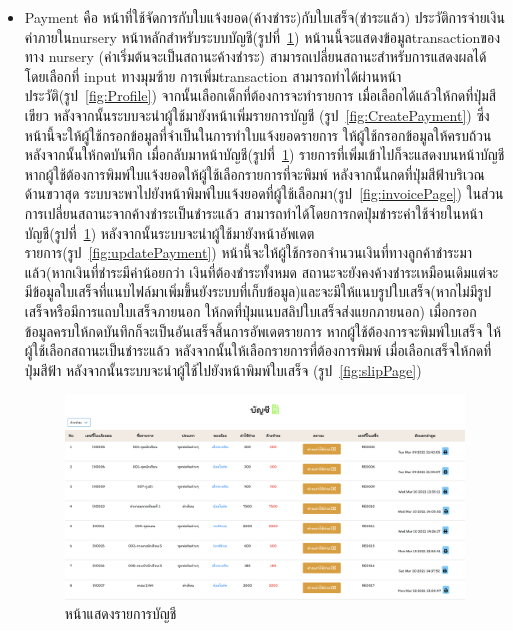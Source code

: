 \begin{itemize}
  \item  Payment คือ หน้าที่ใช้จัดการกับใบแจ้งยอด(ค้างชำระ)กับใบเสร็จ(ชำระแล้ว) ประวัติการจ่ายเงินค่าภายในnursery หน้าหลักสำหรับระบบบัญชี(รูปที่~\ref{fig:Payment}) หน้านนี้จะแสดงข้อมูลtransactionของทาง nursery (ค่าเริ่มต้นจะเป็นสถานะค้างชำระ) สามารถเปลี่ยนสถานะสำหรับการแสดงผลได้ โดยเลือกที่ input ทางมุมซ้าย 
  การเพิ่มtransaction สามารถทำได้ผ่านหน้าประวัติ(รูป~\ref{fig:Profile}) จากนั้นเลือกเด็กที่ต้องการจะทำรายการ เมื่อเลือกได้แล้วให้กดที่ปุ่มสีเขียว
  หลังจากนั้นระบบจะนำผู้ใช้มายังหน้าเพิ่มรายการบัญชี (รูป~\ref{fig:CreatePayment}) ซึ่งหน้านี้จะให้ผู้ใช้กรอกข้อมูลที่จำเป็นในการทำใบแจ้งยอดรายการ ให้ผู้ใช้กรอกข้อมูลให้ครบถ้วน หลังจากนั้นให้กดบันทึก
  เมื่อกลับมาหน้าบัญชี(รูปที่~\ref{fig:Payment}) รายการที่เพิ่มเข้าไปก็จะแสดงบนหน้าบัญชี หากผู้ใช้ต้องการพิมพ์ใบแจ้งยอดให้ผู้ใช้เลือกรายการที่จะพิมพ์ หลังจากนั้นกดที่ปุ่มสีฟ้าบริเวณด้านขวาสุด
  ระบบจะพาไปยังหน้าพิมพ์ใบแจ้งยอดที่ผู้ใช้เลือกมา(รูป~\ref{fig:invoicePage}) 
  ในส่วนการเปลี่ยนสถานะจากค้างชำระเป็นชำระแล้ว สามารถทำได้โดยการกดปุ่มชำระค่าใช้จ่ายในหน้าบัญชี(รูปที่~\ref{fig:Payment}) หลังจากนั้นระบบจะนำผู้ใช้มายังหน้าอัพเดตรายการ(รูป~\ref{fig:updatePayment})
  หน้านี้จะให้ผู้ใช้กรอกจำนวนเงินที่ทางลูกค้าชำระมาแล้ว(หากเงินที่ชำระมีค่าน้อยกว่า เงินที่ต้องชำระทั้งหมด สถานะจะยังคงค้างชำระเหมือนเดิมแต่จะมีข้อมูลใบเสร็จที่แนบไฟล์มาเพิ่มขึ้นยังระบบที่เก็บข้อมูล)และจะมีให้แนบรูปใบเสร็จ(หากไม่มีรูปเสร็จหรือมีการแถบใบเสร็จภายนอก ให้กดที่ปุ่มแนบสลิปใบเสร็จส่งแยกภายนอก)
  เมื่อกรอกข้อมูลครบให้กดบันทึกก็จะเป็นอันเสร็จสิ้นการอัพเดตรายการ หากผู้ใช้ต้องการจะพิมพ์ใบเสร็จ
  ให้ผู้ใช้เลือกสถานะเป็นชำระแล้ว หลังจากนั้นให้เลือกรายการที่ต้องการพิมพ์ เมื่อเลือกเสร็จให้กดที่ปุ่มสีฟ้า
  หลังจากนั้นระบบจะนำผู้ใช้ไปยังหน้าพิมพ์ใบเสร็จ (รูป~\ref{fig:slipPage}) 

  \begin{figure}
    \begin{center}
    \includegraphics[width=\linewidth]{images/Payment.png}
    \end{center}
    \caption[หน้าแสดงรายการบัญชี]{หน้าแสดงรายการบัญชี}
    \label{fig:Payment}
  

\end{figure}
\end{itemize}
